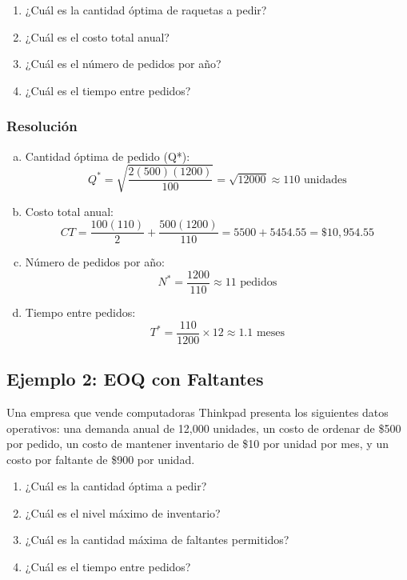 \documentclass[11pt,a4paper]{article}
\begin{document}
\begin{enumerate}[a]
    \item ¿Cuál es la cantidad óptima de raquetas a pedir?
    \item ¿Cuál es el costo total anual?
    \item ¿Cuál es el número de pedidos por año?
    \item ¿Cuál es el tiempo entre pedidos?
\end{enumerate}

\subsubsection{Resolución}
\begin{enumerate}[a.]
    \item Cantidad óptima de pedido (Q*):
    \[ Q^* = \sqrt{\frac{2(500)(1200)}{100}} = \sqrt{12000} \approx 110 \text{ unidades} \]
    
    \item Costo total anual:
    \[ CT = \frac{100(110)}{2} + \frac{500(1200)}{110} = 5500 + 5454.55 = \$10,954.55 \]
    
    \item Número de pedidos por año:
    \[ N^* = \frac{1200}{110} \approx 11 \text{ pedidos} \]
    
    \item Tiempo entre pedidos:
    \[ T^* = \frac{110}{1200} \times 12 \approx 1.1 \text{ meses} \]
\end{enumerate}

\subsection{Ejemplo 2: EOQ con Faltantes}
Una empresa que vende computadoras Thinkpad presenta los siguientes datos operativos: una demanda anual de 12,000 unidades, un costo de ordenar de \$500 por pedido, un costo de mantener inventario de \$10 por unidad por mes, y un costo por faltante de \$900 por unidad.

\begin{enumerate}[a]
    \item ¿Cuál es la cantidad óptima a pedir?
    \item ¿Cuál es el nivel máximo de inventario?
    \item ¿Cuál es la cantidad máxima de faltantes permitidos?
    \item ¿Cuál es el tiempo entre pedidos?
\end{enumerate}
\end{document}
